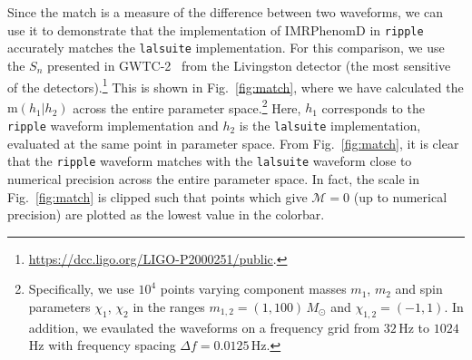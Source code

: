 \documentclass[twocolumn]{aastex631}
\newcommand{\ripple}{\texttt{ripple}\xspace}
\newcommand{\lalsuite}{\texttt{lalsuite}\xspace}
\newcommand{\AZ}[1]{{\color{Burnt}[AZ: #1]}}
\newcommand{\mi}[1]{\textbf{\color{teal}(MI: #1)}}
\begin{document}

Since the match is a measure of the difference between two waveforms, we can use it to demonstrate that the implementation of IMRPhenomD in \ripple accurately matches the \lalsuite implementation. For this comparison, we use the $S_n$  presented in GWTC-2~\citep{LIGOScientific:2020ibl} from the Livingston detector (the most sensitive of the detectors).\footnote{
    \url{https://dcc.ligo.org/LIGO-P2000251/public}.
    }
This is shown in Fig.~\ref{fig:match}, where we have calculated the $\mathrm{m}(h_1|h_2)$ across the entire parameter space.\footnote{
    Specifically, we use $10^4$ points varying component masses $m_1$, $m_2$ and spin parameters $\chi_1$, $\chi_2$ in the ranges $m_{1,2} = (1,100)\,M_{\odot}$ and $\chi_{1,2} = (-1,1)$. In addition, we evaulated the waveforms on a frequency grid from $32\,$Hz to $1024\,$Hz with frequency spacing $\Delta f = 0.0125 \,$Hz.
}
Here, $h_1$ corresponds to the \ripple waveform implementation and $h_2$ is the \lalsuite implementation, evaluated at the same point in parameter space.
From Fig.~\ref{fig:match}, it is clear that the \ripple waveform matches with the \lalsuite waveform close to numerical precision across the entire parameter space.
In fact, the scale in Fig.~\ref{fig:match} is clipped such that points which give $\mathcal{M}=0$ (up to numerical precision) are plotted as the lowest value in the colorbar.
\end{document}
